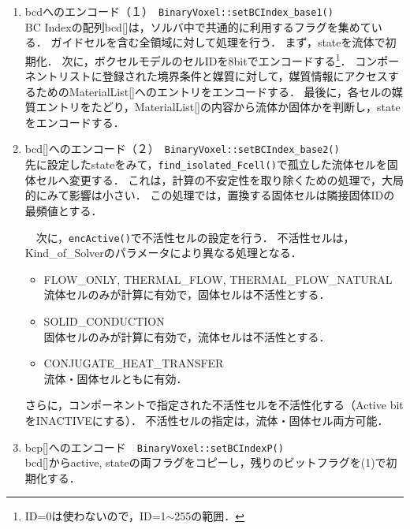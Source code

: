 \begin{enumerate}
%
\item bcdへのエンコード（１）　\verb|BinaryVoxel::setBCIndex_base1()|\\
BC Indexの配列bcd[]は，ソルバ中で共通的に利用するフラグを集めている．
ガイドセルを含む全領域に対して処理を行う．
まず，stateを流体で初期化．
次に，ボクセルモデルのセルIDを8bitでエンコードする\footnote{ID=0は使わないので，ID=1$\sim$255の範囲．}．
コンポーネントリストに登録された境界条件と媒質に対して，媒質情報にアクセスするためのMaterialList[]へのエントリをエンコードする．
最後に，各セルの媒質エントリをたどり，MaterialList[]の内容から流体か固体かを判断し，stateをエンコードする．
\vspace{2mm}

%
\item bcd[]へのエンコード（２）　\verb|BinaryVoxel::setBCIndex_base2()|\\
先に設定したstateをみて，\verb|find_isolated_Fcell()|で孤立した流体セルを固体セルへ変更する．
これは，計算の不安定性を取り除くための処理で，大局的にみて影響は小さい．
この処理では，置換する固体セルは隣接固体IDの最頻値とする．

　次に，\verb|encActive()|で不活性セルの設定を行う．
不活性セルは，Kind\_of\_Solverのパラメータにより異なる処理となる．
\begin{itemize}
\item FLOW\_ONLY, THERMAL\_FLOW, THERMAL\_FLOW\_NATURAL\\
流体セルのみが計算に有効で，固体セルは不活性とする．

\item SOLID\_CONDUCTION\\
固体セルのみが計算に有効で，流体セルは不活性とする．

\item CONJUGATE\_HEAT\_TRANSFER\\
流体・固体セルともに有効．
\end{itemize}

さらに，コンポーネントで指定された不活性セルを不活性化する（Active bitをINACTIVEにする）．
不活性セルの指定は，流体・固体セル両方可能．
\vspace{2mm}

%
\item bcp[]へのエンコード　\verb|BinaryVoxel::setBCIndexP()|\\
bcd[]からactive, stateの両フラグをコピーし，残りのビットフラグを(1)で初期化する．
\vspace{2mm}


\end{enumerate}
